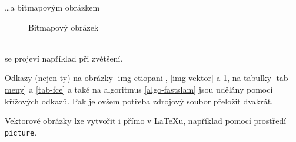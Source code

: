 \documentclass[11pt, a4paper]{article}
\begin{document}
\ldots a bitmapovým obrázkem \\
\begin{figure}[h]
\centering
{}
\caption{Bitmapový obrázek}\label{img-bitmap}
\end{figure} \\
se projeví například při zvětšení.
\par
Odkazy (nejen ty) na obrázky \ref{img-etiopani}, \ref{img-vektor} a \ref{img-bitmap}, na  
tabulky \ref{tab-meny} a \ref{tab-fce} a také na algoritmus \ref{algo-fastslam} jsou udělány pomocí 
křížových odkazů. Pak je ovšem potřeba zdrojový soubor přeložit dvakrát.
\par
Vektorové obrázky lze vytvořit i přímo v \LaTeX{}u, například pomocí prostředí 
\texttt{picture}.
\newpage
\end{document}

